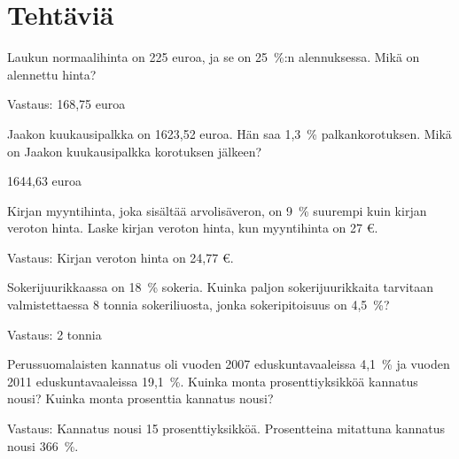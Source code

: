 \section*{Tehtäviä}

\begin{tehtava}
    Laukun normaalihinta on 225 euroa, ja se on 25~\%:n alennuksessa.
    Mikä on alennettu hinta?
    \begin{vastaus}
    Vastaus: 168,75 euroa
    \end{vastaus}
\end{tehtava}

\begin{tehtava}
    Jaakon kuukausipalkka on 1623,52 euroa. Hän saa 1,3~\% palkankorotuksen.
    Mikä on Jaakon kuukausipalkka korotuksen jälkeen?
    \begin{vastaus}
    1644,63 euroa
    \end{vastaus}
\end{tehtava}
\begin{tehtava}
    Kirjan myyntihinta, joka sisältää arvolisäveron, on 9~\% suurempi kuin kirjan veroton hinta. Laske kirjan veroton hinta, kun myyntihinta on 27 \euro.
    \begin{vastaus}
        Vastaus: Kirjan veroton hinta on 24,77 \euro.
    \end{vastaus}
\end{tehtava}

\begin{tehtava}
	Sokerijuurikkaassa on 18~\% sokeria. Kuinka paljon sokerijuurikkaita tarvitaan valmistettaessa 8 tonnia sokeriliuosta, jonka sokeripitoisuus on 4,5~\%?
	\begin{vastaus}
        Vastaus: 2 tonnia
    \end{vastaus}
\end{tehtava}

\begin{tehtava}
    Perussuomalaisten kannatus oli vuoden 2007 eduskuntavaaleissa 4,1~\% ja 
    vuoden 2011 eduskuntavaaleissa 19,1~\%. Kuinka monta prosenttiyksikköä 
    kannatus nousi? Kuinka monta prosenttia kannatus nousi?
    \begin{vastaus}
    Vastaus: Kannatus nousi 15 prosenttiyksikköä. Prosentteina mitattuna kannatus nousi 366~\%.
    \end{vastaus}
\end{tehtava}


